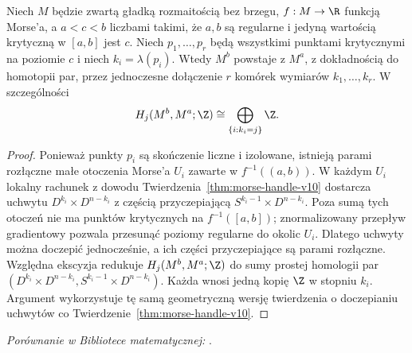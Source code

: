 \begin{lemat}
\label{lem:morse-same-level-audit}
Niech $M$ będzie zwartą gładką rozmaitością bez brzegu,
$f:M\to\R$ funkcją Morse'a, a $a<c<b$ liczbami takimi, że
$a,b$ są regularne i jedyną wartością krytyczną w $[a,b]$ jest $c$.
Niech $p_1,\dots,p_r$ będą wszystkimi punktami krytycznymi na
poziomie $c$ i niech $k_i=\lambda(p_i)$. Wtedy $M^b$ powstaje z $M^a$,
z dokładnością do homotopii par, przez jednoczesne dołączenie
$r$ komórek wymiarów $k_1,\dots,k_r$. W szczególności
\[
 H_j(M^b,M^a;\Z)\cong
 \bigoplus_{\{i:k_i=j\}}\Z.
\]
\end{lemat}
\begin{proof}
Ponieważ punkty $p_i$ są skończenie liczne i izolowane, istnieją
parami rozłączne małe otoczenia Morse'a $U_i$ zawarte w
$f^{-1}((a,b))$. W każdym $U_i$ lokalny rachunek z dowodu
Twierdzenia~\ref{thm:morse-handle-v10} dostarcza uchwytu
$D^{k_i}\times D^{n-k_i}$ z częścią przyczepiającą
$S^{k_i-1}\times D^{n-k_i}$. Poza sumą tych otoczeń
nie ma punktów krytycznych na $f^{-1}([a,b])$;
znormalizowany przepływ gradientowy pozwala przesunąć
poziomy regularne do okolic $U_i$. Dlatego uchwyty można
doczepić jednocześnie, a ich części przyczepiające są
parami rozłączne. Względna ekscyzja redukuje
$H_j(M^b,M^a;\Z)$ do sumy prostej homologii par
$(D^{k_i}\times D^{n-k_i},S^{k_i-1}\times D^{n-k_i})$.
Każda wnosi jedną kopię $\Z$ w stopniu $k_i$.
Argument wykorzystuje tę samą geometryczną wersję twierdzenia
o doczepianiu uchwytów co Twierdzenie~\ref{thm:morse-handle-v10}.
\end{proof}

\noindent\emph{Porównanie w Bibliotece matematycznej:} .

